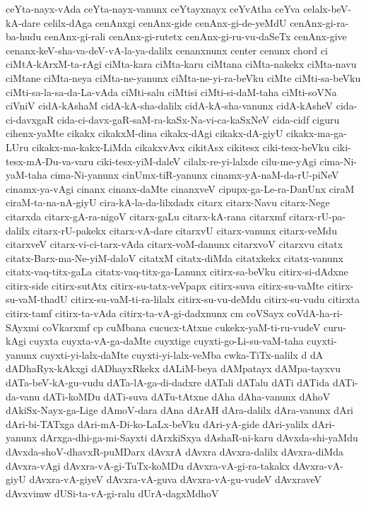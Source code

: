 {ceYta-nayx-vAda
ceYta-nayx-vanunx
ceYtayxnayx
ceYvAtha
ceYva
celalx-beV-kA-dare
celilx-dAga
cenAnxgi
cenAnx-gide
cenAnx-gi-de-yeMdU
cenAnx-gi-ra-ba-hudu
cenAnx-gi-rali
cenAnx-gi-rutetx
cenAnx-gi-ru-vu-daSeTx
cenAnx-give
cenanx-keV-sha-va-deV-vA-la-ya-dalilx
cenanxnunx
center
cenunx
chord
ci
ciMtA-kArxM-ta-rAgi
ciMta-kara
ciMta-karu
ciMtana
ciMta-nakekx
ciMta-navu
ciMtane
ciMta-neya
ciMta-ne-yanunx
ciMta-ne-yi-ra-beVku
ciMte
ciMti-sa-beVku
ciMti-sa-la-sa-da-La-vAda
ciMti-salu
ciMtisi
ciMti-si-daM-taha
ciMti-soVNa
ciVniV
cidA-kAshaM
cidA-kA-sha-dalilx
cidA-kA-sha-vanunx
cidA-kAsheV
cida-ci-davxgaR
cida-ci-davx-gaR-saM-ra-kaSx-Na-vi-ca-kaSxNeV
cida-cidf
ciguru
cihenx-yaMte
cikakx
cikakxM-dina
cikakx-dAgi
cikakx-dA-giyU
cikakx-ma-ga-LUru
cikakx-ma-kakx-LiMda
cikakxvAvx
cikitAsx
cikitesx
ciki-tesx-beVku
ciki-tesx-mA-Du-va-varu
ciki-tesx-yiM-daleV
cilalx-re-yi-lalxde
cilu-me-yAgi
cima-Ni-yaM-taha
cima-Ni-yanunx
cinUmx-tiR-yanunx
cinamx-yA-naM-da-rU-piNeV
cinamx-ya-vAgi
cinanx
cinanx-daMte
cinanxveV
cipupx-ga-Le-ra-DanUnx
ciraM
ciraM-ta-na-nA-giyU
cira-kA-la-da-lilxdadx
citarx
citarx-Navu
citarx-Nege
citarxda
citarx-gA-ra-nigoV
citarx-gaLu
citarx-kA-rana
citarxmf
citarx-rU-pa-dalilx
citarx-rU-pakekx
citarx-vA-dare
citarxvU
citarx-vanunx
citarx-veMdu
citarxveV
citarx-vi-ci-tarx-vAda
citarx-voM-danunx
citarxvoV
citarxvu
citatx
citatx-Barx-ma-Ne-yiM-daloV
citatxM
citatx-diMda
citatxkekx
citatx-vanunx
citatx-vaq-titx-gaLa
citatx-vaq-titx-ga-Lanunx
citirx-sa-beVku
citirx-si-dAdxne
citirx-side
citirx-sutAtx
citirx-su-tatx-veVpapx
citirx-suva
citirx-su-vaMte
citirx-su-vaM-thadU
citirx-su-vaM-ti-ra-lilalx
citirx-su-vu-deMdu
citirx-su-vudu
citirxta
citirx-tamf
citirx-ta-vAda
citirx-ta-vA-gi-dadxnunx
cm
coVSayx
coVdA-ha-ri-SAyxmi
coVkarxmf
cp
cuMbana
cucucx-tAtxne
cukekx-yaM-ti-ru-vudeV
curu-kAgi
cuyxta
cuyxta-vA-ga-daMte
cuyxtige
cuyxti-go-Li-su-vaM-taha
cuyxti-yanunx
cuyxti-yi-lalx-daMte
cuyxti-yi-lalx-veMba
cwka-TiTx-nalilx
d
dA
dADhaRyx-kAkxgi
dADhayxRkekx
dALiM-beya
dAMpatayx
dAMpa-tayxvu
dATa-beV-kA-gu-vudu
dATa-lA-ga-di-dadxre
dATali
dATalu
dATi
dATida
dATi-da-vanu
dATi-koMDu
dATi-suva
dATu-tAtxne
dAha
dAha-vanunx
dAhoV
dAkiSx-Nayx-ga-Lige
dAmoV-dara
dAna
dArAH
dAra-dalilx
dAra-vanunx
dAri
dAri-bi-TATxga
dAri-mA-Di-ko-LaLx-beVku
dAri-yA-gide
dAri-yalilx
dAri-yanunx
dArxga-dhi-ga-mi-Sayxti
dArxkiSxya
dAshaR-ni-karu
dAvxda-shi-yaMdu
dAvxda-shoV-dhavxR-puMDarx
dAvxrA
dAvxra
dAvxra-dalilx
dAvxra-diMda
dAvxra-vAgi
dAvxra-vA-gi-TuTx-koMDu
dAvxra-vA-gi-ra-takakx
dAvxra-vA-giyU
dAvxra-vA-giyeV
dAvxra-vA-guva
dAvxra-vA-gu-vudeV
dAvxraveV
dAvxvimw
dUSi-ta-vA-gi-ralu
dUrA-dagxMdhoV
}
